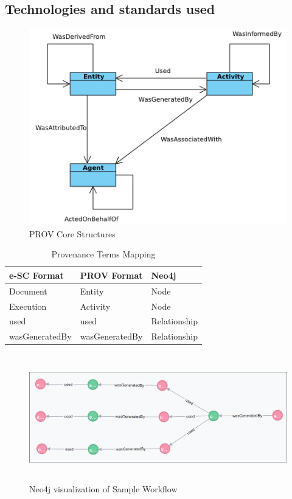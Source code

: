 \documentclass[10pt,conference,twocolumn]{IEEEtran}
\begin{document}
\subsection{Technologies and standards used}
\begin{figure}[H]
  \centering
  \includegraphics[scale=0.73]{ProvDM.png}
  \caption{PROV Core Structures}
  \label{fig:PROV-DM: The PROV Data Model}
\end{figure}

\setlength{\arrayrulewidth}{0.8mm}
\setlength{\tabcolsep}{15pt}
\renewcommand{\arraystretch}{1.3}
\begin{table}[H]
\caption{Provenance Terms Mapping}
\label{my-label}
\begin{tabular}{ |p{1.90cm}|p{1.90cm}|p{1.90cm}|  }
\hline
e-SC Format & PROV Format &  Neo4j\\
\hline
Document & Entity & Node\\
Execution & Activity  & Node\\
used & used & Relationship\\
wasGeneratedBy & wasGeneratedBy & Relationship\\
\hline
\end{tabular}
\end{table}

\begin{figure}[!htp]
  \includegraphics[width=18cm,height=5.5cm]{Simple_Workflow.png}
  \caption{Neo4j visualization of Sample Workflow}
\label{fig:Simple Workflow}
\end{figure}
\end{document}
